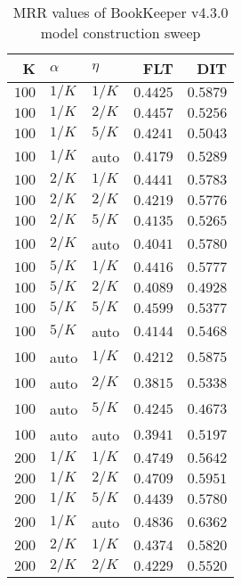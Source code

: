 
\begin{table}
\begin{spacing}{1.2}
\centering
\caption{MRR values of BookKeeper v4.3.0 model construction sweep}
\label{table:bookkeeper_model_sweep}
\vspace{0.2em}
\parbox{.45\linewidth}{\centering \begin{tabular}{rll|rr}
\toprule
    K &  $\alpha$ &    $\eta$ & FLT &   DIT \\
\midrule
$100$ &  $1/K$ &  $1/K$ &         $0.4425$ & $0.5879$ \\
$100$ &  $1/K$ &  $2/K$ &         $0.4457$ & $0.5256$ \\
$100$ &  $1/K$ &  $5/K$ &         $0.4241$ & $0.5043$ \\
$100$ &  $1/K$ &   auto &         $0.4179$ & $0.5289$ \\
$100$ &  $2/K$ &  $1/K$ &         $0.4441$ & $0.5783$ \\
$100$ &  $2/K$ &  $2/K$ &         $0.4219$ & $0.5776$ \\
$100$ &  $2/K$ &  $5/K$ &         $0.4135$ & $0.5265$ \\
$100$ &  $2/K$ &   auto &         $0.4041$ & $0.5780$ \\
$100$ &  $5/K$ &  $1/K$ &         $0.4416$ & $0.5777$ \\
$100$ &  $5/K$ &  $2/K$ &         $0.4089$ & $0.4928$ \\
$100$ &  $5/K$ &  $5/K$ &         $0.4599$ & $0.5377$ \\
$100$ &  $5/K$ &   auto &         $0.4144$ & $0.5468$ \\
$100$ &   auto &  $1/K$ &         $0.4212$ & $0.5875$ \\
$100$ &   auto &  $2/K$ &         $0.3815$ & $0.5338$ \\
$100$ &   auto &  $5/K$ &         $0.4245$ & $0.4673$ \\
$100$ &   auto &   auto &         $0.3941$ & $0.5197$ \\
$200$ &  $1/K$ &  $1/K$ &         $0.4749$ & $0.5642$ \\
$200$ &  $1/K$ &  $2/K$ &         $0.4709$ & $0.5951$ \\
$200$ &  $1/K$ &  $5/K$ &         $0.4439$ & $0.5780$ \\
$200$ &  $1/K$ &   auto &         $0.4836$ & $0.6362$ \\
$200$ &  $2/K$ &  $1/K$ &         $0.4374$ & $0.5820$ \\
$200$ &  $2/K$ &  $2/K$ &         $0.4229$ & $0.5520$ \\

\end{tabular}}
\end{spacing}
\end{table}
